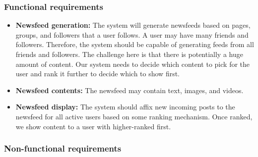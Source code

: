 \subsubsection{Functional requirements}\label{_yo4W9pgjt1CFrVAZUbTv}

\begin{itemize}
\item
\protect{}\label{tndOLJ51LR_Z22onzECbH}
\textbf{Newsfeed generation:} The system will generate newsfeeds based on pages, groups, and followers that a user follows. A user may have many friends and followers. Therefore, the system should be capable of generating feeds from all friends and followers. The challenge here is that there is potentially a huge amount of content. Our system needs to decide which content to pick for the user and rank it further to decide which to show first.
\item
\protect{}\label{s0Df1u2Bu9BCUKs4cdcke}
\textbf{Newsfeed contents:} The newsfeed may contain text, images, and videos.
\item
\protect{}\label{qv-O7WeGAlWei8tp79G6f}
\textbf{Newsfeed display:} The system should affix new incoming posts to the newsfeed for all active users based on some ranking mechanism. Once ranked, we show content to a user with higher-ranked first.
\end{itemize}

\subsubsection{Non-functional requirements}\label{Yk89ZfRB_4WYYhRfwvki6}

